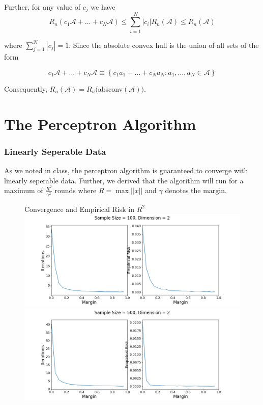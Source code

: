 \documentclass[a4paper, 11pt]{article} %
\begin{document}
Further, for any value of $c_j$ we have 
$$R _ { n } \left( c _ { 1 } \mathcal { A } + \ldots + c _ { N } \mathcal { A } \right) \leq \sum _ { i = 1 } ^ { N } \left| c _ { i } \right| R _ { n } ( \mathcal { A } ) \leq R _ { n } ( \mathcal { A } )$$

where $\sum _ { j = 1 } ^ { N } \left| c _ { j } \right| = 1$. Since the absolute convex hull is the union of all sets of the form

$$c _ { 1 } \mathcal { A } + \ldots + c _ { N } \mathcal { A } \equiv \left\{ c _ { 1 } a _ { 1 } + \ldots + c _ { N } a _ { N } : a _ { 1 } , \ldots , a _ { N } \in \mathcal { A } \right\}$$

Consequently, $R _ { n } ( \mathcal { A } ) = R _ { n } ($absconv$(\mathcal { A }) )$.


\section*{The Perceptron Algorithm}

\subsubsection*{Linearly Seperable Data}

As we noted in class, the perceptron algorithm is guaranteed to converge with linearly seperable data. Further, we derived that the algorithm will run for a maximum of $\frac{R^2}{\gamma^2}$ rounds where $R = \max ||x||$ and $\gamma$ denotes the margin.

\begin{figure}[H]
\centering
Convergence and Empirical Risk in $R^2$
\includegraphics[scale= 0.4]{Perceptron_Seperable100_d2}
\includegraphics[scale= 0.4]{Perceptron_Seperable500_d2}
\end{figure}
\end{document}
